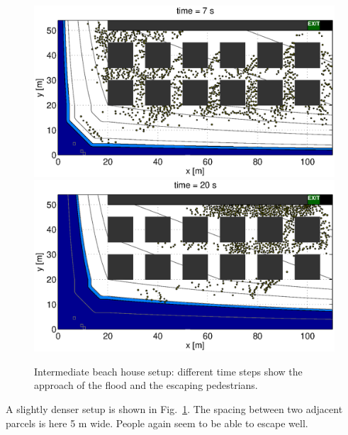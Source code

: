 \documentclass[11pt]{article}
\begin{document}
\begin{figure}
	\centering
	\includegraphics[width=1.1\textwidth]{figures/BeachEvacuationOneExitStreetWidth5_Flood0_1_000700.eps}
	\qquad
	\includegraphics[width=1.1\textwidth]{figures/BeachEvacuationOneExitStreetWidth5_Flood0_1_002000.eps}
	\caption{Intermediate beach house setup: different time steps show the approach of the flood and the escaping pedestrians.}
	\label{fig:beach_2}
\end{figure}

A slightly denser setup is shown in Fig.~\ref{fig:beach_2}. The spacing between two adjacent parcels is here 5 m wide. People again seem to be able to escape well.
\end{document}
